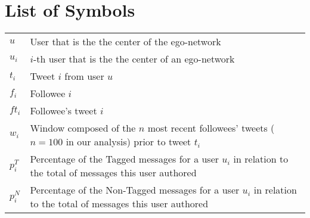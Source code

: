 \documentclass[11pt,twoside,a4paper]{book}
\renewcommand{\chaptermark}[1]{\markboth{\MakeUppercase{#1}}{}}
\begin{document}
\chapter{List of Symbols}
\begin{table}[htbp]
	\begin{tabular}{>{\raggedright\arraybackslash}m{2cm}m{14cm}}
					$u$    & User that is the the center of the ego-network\\
					$u_i$    & $i$-th user that is the the center of an ego-network\\
					$t_i$    & Tweet $i$ from user $u$\\
					$f_i$    & Followee $i$\\
					$ft_i$    & Followee's tweet $i$\\
					$w_i$    & Window composed of the $n$ most recent followees' tweets ($n=100$ in our analysis) prior to tweet $t_i$\\
					$p_i^T$    & Percentage of the Tagged messages for a user $u_i$ in relation to the total of messages this user authored\\
					$p_i^N$    & Percentage of the Non-Tagged messages for a user $u_i$ in relation to the total of messages this user authored\\
	\end{tabular}
\end{table}

\listoffigures            
\listoftables            

\mainmatter

\fancyhead[RE,LO]{\thesection}

\singlespacing              %
\hypersetup{pageanchor=true}








\renewcommand{\chaptermark}[1]{\markboth{\MakeUppercase{\appendixname\ \thechapter}} {\MakeUppercase{#1}} }
\fancyhead[RE,LO]{}
\appendix



\backmatter \singlespacing   %


%
\end{document}
